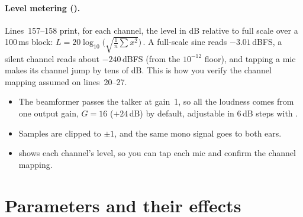 \documentclass[11pt]{article}
\begin{document}
\paragraph{Level metering ().} Lines~157--158 print, for each channel, the
level in dB relative to full scale over a 100\,ms block:
$L=20\log_{10}\!\big(\sqrt{\tfrac1n\sum x^2}\big)$\,. A full-scale sine reads
$-3.01$\,dBFS, a silent channel reads about $-240$\,dBFS (from the $10^{-12}$ floor), and
tapping a mic makes its channel jump by tens of dB. This is how you verify the channel mapping
assumed on lines~20--27.

\begin{takeaways}
\begin{itemize}[nosep]
\item The beamformer passes the talker at gain~1, so all the loudness comes from one output gain,
  $G=16$ ($+24$\,dB) by default, adjustable in 6\,dB steps with .
\item Samples are clipped to $\pm1$, and the same mono signal goes to both ears.
\item {} shows each channel's level, so you can tap each mic and confirm the channel
  mapping.
\end{itemize}
\end{takeaways}

\appendix
\section{Parameters and their effects}\label{app:params}
\end{document}
